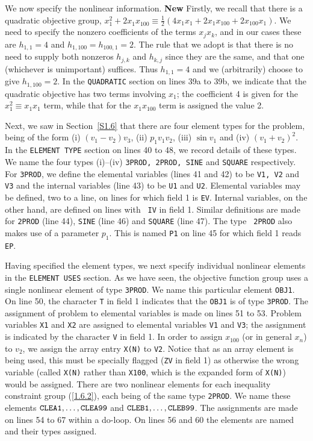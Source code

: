 \documentclass[a4paper]{article}
\newcommand{\req}[1]{(\ref{#1})}
\newcommand{\sfrac}[2]{{\scriptstyle \frac{#1}{#2}}}
\newcommand{\half}{\sfrac{1}{2}}
\begin{document}
We now specify the nonlinear information. {\bf New} Firstly, we recall that
there is a quadratic objective group, 
$x_1^2 + 2 x_1^{ } x_{100}^{ } \equiv \half( 4 x_1 x_1 + 
 2 x_1 x_{100} + 2 x_{100} x_1 )$. We need to specify the nonzero coefficients
of the terms $x_j x_k$, and in our cases these are 
$h_{1,1} = 4$ and $h_{1,100} = h_{100,1} = 2$. 
The rule that we adopt is
that there is no need to supply both nonzeros 
$h_{j,k}$ and $h_{k,j}$ since they are the same, and
that one (whichever is unimportant) suffices. Thus $h_{1,1} = 4$ 
and we (arbitrarily) choose to give $h_{1,100} = 2$. 
In the {\tt QUADRATIC} section on lines 39a to 39b, we indicate that
the quadratic objective has two terms involving
${x_1}$; the coefficient 4 is given for the 
${x_1^2 \equiv x_1^{ } x_1^{ }}$ term, while that for 
the ${x_1 x_{100}}$ term is assigned the value 2.

Next, we saw in Section~\ref{S1.6}
that there are four element types
for  the problem, being of  the form
(i) $(v_1 - v_2 ) v_3$, (ii) $p_1 v_1 v_2$, (iii) $\sin v_1$  and (iv)
$(v_1 + v_2  )^2$.  In  the {\tt ELEMENT  TYPE}
section on lines 40 to 48, we record details  of these types.  We name
the four  types (i)--(iv) {\tt 3PROD,  2PROD, SINE}  and  {\tt SQUARE}
respectively.   For  {\tt 3PROD},  we define  the elemental  variables
(lines 41  and 42) to be {\tt  V1, V2}  and {\tt V3}  and the internal
variables (line 43) to be {\tt U1} and  {\tt U2}.  Elemental variables
may be defined, two to a line, on lines for which field 1 is {\tt EV}.
Internal variables,
on the other hand, are defined on lines  with {\tt
IV}  in field 1.  Similar definitions  are  made for {\tt 2PROD} (line
44), {\tt SINE} (line 46)  and {\tt  SQUARE} (line  47). The type {\tt
2PROD} also makes use of a parameter $p_1$. This is named {\tt  P1}
on line 45 for which field 1 reads {\tt EP}.

Having   specified the  element  types,
we  next   specify individual
nonlinear elements
in the {\tt  ELEMENT USES}
section.  As we have seen, the objective function
group uses  a single
nonlinear element of type
{\tt 3PROD}. We name this particular element
{\tt OBJ1}.  On line 50,  the character {\tt  T}  in field 1 indicates
that the {\tt OBJ1} is of type  {\tt 3PROD}. The assignment of problem
to  elemental variables
is made on  lines  51 to 53. Problem variables
{\tt X1} and {\tt X2} are assigned to elemental variables {\tt V1} and
{\tt V3}; the assignment  is  indicated by the   character {\tt V}  in
field 1.  In order to assign $x_{100}$ (or in general $x_n$) to $v_2$,
we assign the array
entry {\tt X(N)}  to {\tt  V2}. Notice  that as an
array element is being used, this must be specially flagged  ({\tt ZV}
in field 1) as otherwise the wrong variable (called {\tt  X(N)} rather
than {\tt X100}, which is  the expanded form of  {\tt X(N)}) would be
assigned.   There are two   nonlinear  elements
for   each inequality
constraint group
\req{1.6.2}, each being of  the same type  {\tt 2PROD}. We  name these
elements
${\tt   CLEA1,\ldots,  CLEA99}$  and    ${\tt  CLEB1,\ldots,
CLEB99}$. The assignments are made on lines 54 to 67 within a do-loop.
On lines 56 and 60  the elements are named
and their  types assigned.
\end{document}
